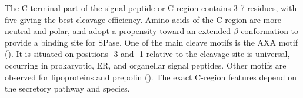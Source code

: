 The C-terminal part of the signal peptide or C-region contains 3-7 residues,
with five giving the best cleavage efficiency.
Amino acids of the C-region are more neutral and polar, 
and adopt a propensity toward an extended $\beta$-conformation to provide a binding site for SPase.
One of the main cleave motifs is the AXA motif (\cite{von1984}).
It is situated on positions -3 and -1 relative to the cleavage site is universal,
occurring in prokaryotic, ER, and organellar signal peptides.
Other motifs are observed for lipoproteins and prepolin (\cite{paetzel2002}).
The exact C-region features depend on the secretory pathway and species.


